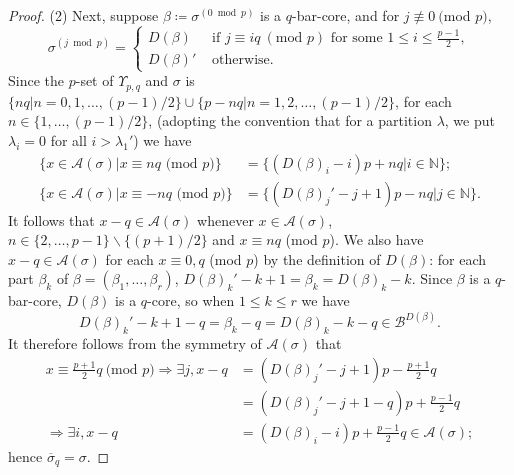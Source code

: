 \documentclass[ALCO, Unicode,published]{cedram}
\newcommand*\nicefrac[2]{#1/#2}
\begin{document}
\begin{proof}
\noindent
(2) Next, suppose $\beta\coloneqq\sigma^{(0\bmod p)}$ is a $q$-bar-core, and for $j\not\equiv0\:($mod $p)$, 
$$\sigma^{(j\bmod p)}=\begin{cases}D(\beta)&\text{ if } j\equiv iq\:(\text{mod }p)\text{ for some }1\leq i\leq\tfrac{p-1}{2},\\D(\beta)'&\text{ otherwise.}\end{cases}$$ 
Since the $p$-set of $\Upsilon_{p,q}$ and $\sigma$ is $\{nq|n=0,1,\dots,\nicefrac{(p-1)}{2}\}\cup\{p-nq|n=1,2,\dots,\nicefrac{(p-1)}{2}\}$, for each $n\in\{1,\dots,\nicefrac{(p-1)}{2}\}$, (adopting the convention that for a partition $\lambda$, we put $\lambda_i=0$ for all $i>\lambda_1'$) we have 
\begin{align*}\{x\in\mathcal{A}(\sigma)|x\equiv nq\text{ (mod }p)\}&=\{(D(\beta)_i-i)p+nq|i\in\mathbb{N}\};\\
\{x\in\mathcal{A}(\sigma)|x\equiv-nq\text{ (mod }p)\}&=\{(D(\beta)_j'-j+1)p-nq|j\in\mathbb{N}\}.\end{align*}
It follows that $x-q\in\mathcal{A}(\sigma)$ whenever $x\in\mathcal{A}(\sigma)$, $n\in\{2,\dots,p-1\}\backslash\{\nicefrac{(p+1)}{2}\}$ and $x\equiv nq$ (mod $p$). We also have $x-q\in\mathcal{A}(\sigma)$ for each $x\equiv0,q$ (mod $p$) by the definition of $D(\beta)$: for each part $\beta_k$ of $\beta=(\beta_1,\dots,\beta_r)$, $D(\beta)_k'-k+1=\beta_k=D(\beta)_k-k$. Since $\beta$ is a $q$-bar-core, $D(\beta)$ is a $q$-core, so when $1\leq k\leq r$ we have 
$$D(\beta)_k'-k+1-q=\beta_k-q=D(\beta)_k-k-q\in\mathcal{B}^{D(\beta)}.$$ 
It therefore follows from the symmetry of $\mathcal{A}(\sigma)$ that 
\begin{align*}x\equiv\tfrac{p+1}{2}q\:\text{(mod }p)\Rightarrow\exists j,x-q&=(D(\beta)_j'-j+1)p-\tfrac{p+1}{2}q\\
&=(D(\beta)_j'-j+1-q)p+\tfrac{p-1}{2}q\\
\Rightarrow\exists i,x-q&=(D(\beta)_i-i)p+\tfrac{p-1}{2}q\in\mathcal{A}(\sigma);\end{align*}
hence $\overline{\sigma}_q=\sigma$. 


\end{proof}
\end{document}
